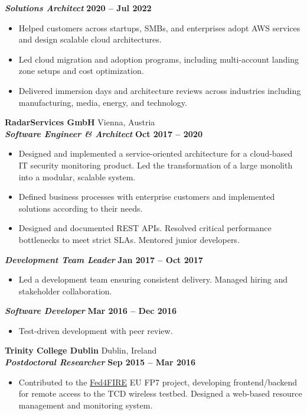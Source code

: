 \documentclass[11pt,a4paper]{article}
\newcommand{\company}[2]{%
  {\large\bfseries #1} \hfill {\color{loccolor}#2}\\[2pt]%
}
\newcommand{\role}[2]{%
  {\bfseries\itshape #1} \hfill {\color{datecolor}\bfseries #2}\vspace{3pt}%
}
\newcommand{\subrole}[2]{%
  \vspace{6pt}%
  {\bfseries\itshape #1} \hfill {\color{datecolor}\bfseries #2}\vspace{3pt}%
}
\begin{document}
\subrole{Solutions Architect}{2020 -- Jul 2022}
\begin{itemize}[nosep,leftmargin=*]
\item Helped customers across startups, SMBs, and enterprises adopt AWS services and design scalable cloud architectures.
\item Led cloud migration and adoption programs, including multi-account landing zone setups and cost optimization.
\item Delivered immersion days and architecture reviews across industries including manufacturing, media, energy, and technology.
\end{itemize}

\bigskip
\company{RadarServices GmbH}{Vienna, Austria}
\role{Software Engineer \& Architect}{Oct 2017 -- 2020}
\begin{itemize}[nosep,leftmargin=*]
\item Designed and implemented a service-oriented architecture for a cloud-based IT security monitoring product. Led the transformation of a large monolith into a modular, scalable system.
\item Defined business processes with enterprise customers and implemented solutions according to their needs.
\item Designed and documented REST APIs. Resolved critical performance bottlenecks to meet strict SLAs. Mentored junior developers.
\end{itemize}

\subrole{Development Team Leader}{Jan 2017 -- Oct 2017}
\begin{itemize}[nosep,leftmargin=*]
\item Led a development team ensuring consistent delivery. Managed hiring and stakeholder collaboration.
\end{itemize}

\subrole{Software Developer}{Mar 2016 -- Dec 2016}
\begin{itemize}[nosep,leftmargin=*]
\item Test-driven development with peer review.
\end{itemize}

\bigskip
\company{Trinity College Dublin}{Dublin, Ireland}
\role{Postdoctoral Researcher}{Sep 2015 -- Mar 2016}
\begin{itemize}[nosep,leftmargin=*]
\item Contributed to the \href{https://www.fed4fire.eu/}{Fed4FIRE} EU FP7 project, developing frontend/backend for remote access to the TCD wireless testbed. Designed a web-based resource management and monitoring system.
\end{itemize}
\end{document}
